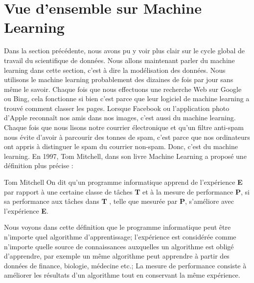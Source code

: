 \documentclass[12pt, french]{report}
\begin{document}
\section{Vue d'ensemble sur Machine Learning} \label{section:ml}

Dans la section précédente, nous avons pu y voir plus clair sur le cycle global de travail du scientifique de données. Nous allons maintenant parler du machine learning dans cette section, c'est à dire la modélisation des données. Nous utilisons le machine learning probablement des dizaines de fois par jour sans même le savoir. Chaque fois que nous effectuons une recherche Web sur Google ou Bing, cela fonctionne si bien c'est parce que leur logiciel de machine learning a trouvé comment classer les pages. Lorsque Facebook ou l'application photo d'Apple reconnaît nos amis dans nos images, c'est aussi du machine learning. Chaque fois que nous lisons notre courrier électronique et qu'un filtre anti-spam nous évite d'avoir à parcourir des tonnes de spam, c'est parce que nos ordinateurs ont appris à distinguer le spam du courrier non-spam. Donc, c'est du machine learning. En 1997, Tom Mitchell, dans son livre \guillemotleft Machine Learning \guillemotright a proposé une définition plus précise : 

\begin{pquotation} {Tom Mitchell \cite[p.~2]{key37}}
	\guillemotleft On dit qu'un programme informatique apprend de l'expérience \textbf{E} par rapport à une certaine classe de tâches \textbf{T} et à la mesure de performance \textbf{P}, si sa performance aux tâches dans \textbf{T} , telle que mesurée par \textbf{P}, s'améliore avec l'expérience \textbf{E}\guillemotright.
\end{pquotation} 

Nous voyons dans cette définition que le programme informatique peut être n'importe quel algorithme d'apprentissage; l'expérience est considérée comme n'importe quelle source de connaissances auxquelles un algorithme est obligé d'apprendre, par exemple un même algorithme peut apprendre à partir des données de finance, biologie, médecine etc.; La mesure de performance consiste à améliorer les résultats d'un algorithme tout en conservant la même expérience. \\ 
\end{document}
